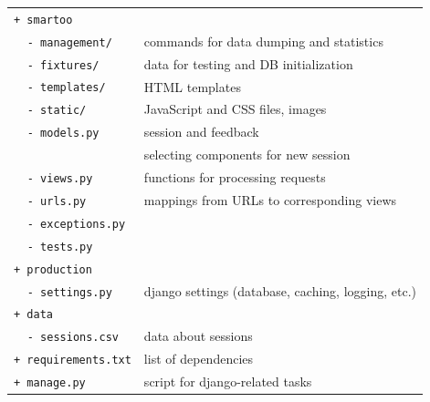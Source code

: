 \documentclass[12pt, twoside]{fithesis2}
\renewcommand{\_}{\leavevmode \kern0.07em\vbox{\hrule width0.4em}}
\begin{document}
\begin{tabular}{l l l}
\multicolumn{2}{l}{\texttt{+ smartoo}} & \\
& \texttt{- management/} & commands for data dumping and statistics\\
& \texttt{- fixtures/} & data for testing and DB initialization\\
& \texttt{- templates/} & HTML templates\\
& \texttt{- static/} & JavaScript and CSS files, images\\
& \texttt{- models.py} & session and feedback\\
& \texttt{- components\_selector.py} & selecting components for new session\\
& \texttt{- views.py} & functions for processing requests\\
& \texttt{- urls.py} & mappings from URLs to corresponding views\\
& \texttt{- exceptions.py} & \\
& \texttt{- tests.py} & \\

\multicolumn{2}{l}{\texttt{+ production}} & \\
& \texttt{- settings.py} & django settings (database, caching, logging, etc.)\\

\multicolumn{2}{l}{\texttt{+ data}} & \\
& \texttt{- sessions.csv} & data about sessions\\

\multicolumn{2}{l}{\texttt{+ requirements.txt}} & list of dependencies\\
\multicolumn{2}{l}{\texttt{+ manage.py}} & script for django-related tasks\\
\end{tabular}
\end{document}
